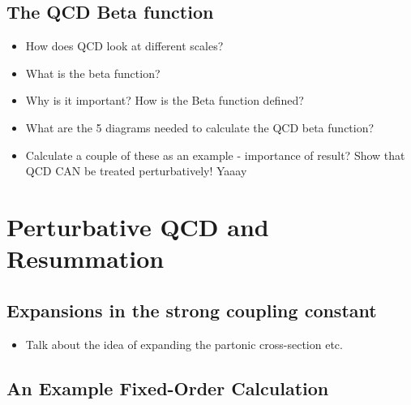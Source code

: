 	\subsection{The QCD Beta function}

	\begin{itemize}
		\item How does QCD look at different scales?
		\item What is the beta function?
		\item Why is it important? How is the Beta function defined?
		\item What are the 5 diagrams needed to calculate the QCD beta function?
		\item Calculate a couple of these as an example - importance of result? Show that QCD CAN be treated perturbatively! Yaaay
	\end{itemize}

\section{Perturbative QCD and Resummation}

	\subsection{Expansions in the strong coupling constant}

	\begin{itemize}
		\item Talk about the idea of expanding the partonic cross-section etc.
	\end{itemize}

	\subsection{An Example Fixed-Order Calculation}

